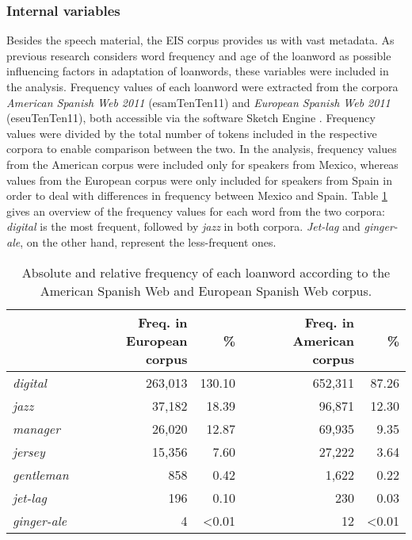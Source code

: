 \documentclass[output=paper]{langscibook}
\begin{document}
\subsubsection{Internal variables}\label{baumler:sec:internal_variables}
Besides the speech material, the \gls*{EIS} corpus provides us with vast metadata. As previous research considers word frequency and age of the loanword as possible influencing factors in adaptation of loanwords, these variables were included in the analysis. Frequency values of each loanword were extracted from the corpora \textit{American Spanish Web 2011} (esamTenTen11) and \textit{European Spanish Web 2011} (eseuTenTen11), both accessible via the software Sketch Engine \citep[]{kilgarriff2014sketch}. Frequency values were divided by the total number of tokens included in the respective corpora to enable comparison between the two. In the analysis, frequency values from the American corpus were included only for speakers from Mexico, whereas values from the European corpus were only included for speakers from Spain in order to deal with differences in frequency between Mexico and Spain. Table \ref{baumler:tab:frequencies} gives an overview of the frequency values for each word from the two corpora: \textit{digital} is the most frequent, followed by \textit{jazz} in both corpora. \textit{Jet-lag} and \textit{ginger-ale}, on the other hand, represent the less-frequent ones.


\begin{table}
\caption{Absolute and relative frequency of each loanword according to the American Spanish Web and European Spanish Web corpus.}
\label{baumler:tab:frequencies}	
{\small
 \begin{tabularx}{\textwidth}{Xrrrr}
\midrule\toprule
 & Freq. in European corpus & \% & Freq. in American  corpus & \%\\
  \midrule
  \textit{digital}      & 263,013 &130.10      & 652,311 &87.26   \\
  \textit{jazz}         & 37,182  &18.39       & 96,871  &12.30     \\
  \textit{manager}      & 26,020  &12.87       & 69,935  &9.35     \\
  \textit{jersey}       & 15,356  &7.60        & 27,222  &3.64     \\
  \textit{gentleman}    & 858     &0.42        & 1,622   &0.22      \\
  \textit{jet-lag}      & 196     &0.10        & 230     &0.03        \\
  \textit{ginger-ale}   & 4       &<0.01       & 12      &<0.01       \\
\bottomrule\midrule
 \end{tabularx} 
 }
\end{table}
\end{document}
